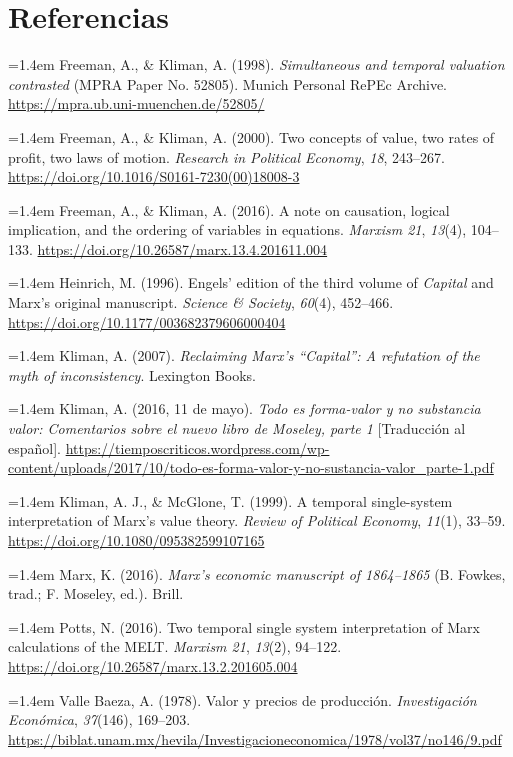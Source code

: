 \documentclass[10pt,twoside]{article}
\begin{document}
\section*{Referencias}
\begingroup\small
\setlength{\parindent}{0pt}\setlength{\parskip}{.65em}
\newcommand{\bibentry}[1]{\par\hangindent=1.4em #1\par}
\bibentry{Freeman, A., \& Kliman, A. (1998). \emph{Simultaneous and temporal valuation contrasted} (MPRA Paper No. 52805). Munich Personal RePEc Archive. \url{https://mpra.ub.uni-muenchen.de/52805/}}
\bibentry{Freeman, A., \& Kliman, A. (2000). Two concepts of value, two rates of profit, two laws of motion. \emph{Research in Political Economy}, \emph{18}, 243--267. \url{https://doi.org/10.1016/S0161-7230(00)18008-3}}
\bibentry{Freeman, A., \& Kliman, A. (2016). A note on causation, logical implication, and the ordering of variables in equations. \emph{Marxism 21}, \emph{13}(4), 104--133. \url{https://doi.org/10.26587/marx.13.4.201611.004}}
\bibentry{Heinrich, M. (1996). Engels' edition of the third volume of \emph{Capital} and Marx's original manuscript. \emph{Science \& Society}, \emph{60}(4), 452--466. \url{https://doi.org/10.1177/003682379606000404}}
\bibentry{Kliman, A. (2007). \emph{Reclaiming Marx's ``Capital'': A refutation of the myth of inconsistency}. Lexington Books.}
\bibentry{Kliman, A. (2016, 11 de mayo). \emph{Todo es forma-valor y no substancia valor: Comentarios sobre el nuevo libro de Moseley, parte 1} [Traducción al español]. \url{https://tiemposcriticos.wordpress.com/wp-content/uploads/2017/10/todo-es-forma-valor-y-no-sustancia-valor_parte-1.pdf}}
\bibentry{Kliman, A. J., \& McGlone, T. (1999). A temporal single-system interpretation of Marx's value theory. \emph{Review of Political Economy}, \emph{11}(1), 33--59. \url{https://doi.org/10.1080/095382599107165}}
\bibentry{Marx, K. (2016). \emph{Marx's economic manuscript of 1864--1865} (B. Fowkes, trad.; F. Moseley, ed.). Brill.}
\bibentry{Potts, N. (2016). Two temporal single system interpretation of Marx calculations of the MELT. \emph{Marxism 21}, \emph{13}(2), 94--122. \url{https://doi.org/10.26587/marx.13.2.201605.004}}
\bibentry{Valle Baeza, A. (1978). Valor y precios de producción. \emph{Investigación Económica}, \emph{37}(146), 169--203. \url{https://biblat.unam.mx/hevila/Investigacioneconomica/1978/vol37/no146/9.pdf}}
\endgroup
\end{document}
